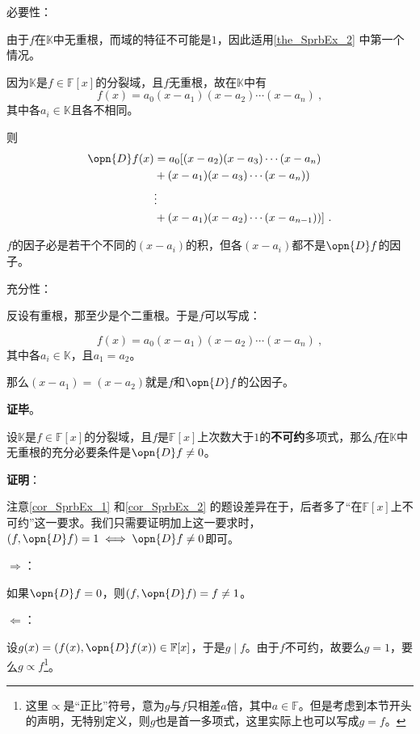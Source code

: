 必要性：

由于$f$在$\mathbb{K}$中无重根，而域的特征不可能是$1$，因此适用\autoref{the_SprbEx_2} 中第一个情况。

因为$\mathbb{K}$是$f\in\mathbb{F}[x]$的分裂域，且$f$无重根，故在$\mathbb{K}$中有
\begin{equation}
f(x) = a_0(x-a_1)(x-a_2)\cdots(x-a_n)~,
\end{equation}
其中各$a_i\in\mathbb{K}$且各不相同。

则
\begin{equation}
\begin{aligned}
\opn{D}f(x) &= a_0[(x-a_2)(x-a_3)\cdots(x-a_n)\\
&+(x-a_1)(x-a_3)\cdots(x-a_n))\\
&\vdots\\
&+(x-a_1)(x-a_2)\cdots(x-a_{n-1}))
]~.
\end{aligned}
\end{equation}

$f$的因子必是若干个不同的$(x-a_i)$的积，但各$(x-a_i)$都不是$\opn{D}f$的因子。

充分性：

反设有重根，那至少是个二重根。于是$f$可以写成：

\begin{equation}
f(x) = a_0(x-a_1)(x-a_2)\cdots(x-a_n)~,
\end{equation}
其中各$a_i\in\mathbb{K}$，且$a_1=a_2$。

那么$(x-a_1)=(x-a_2)$就是$f$和$\opn{D}f$的公因子。

\textbf{证毕}。



\begin{corollary}{}\label{cor_SprbEx_2}
设$\mathbb{K}$是$f\in\mathbb{F}[x]$的分裂域，且$f$是$\mathbb{F}[x]$上次数大于$1$的\textbf{不可约}多项式，那么$f$在$\mathbb{K}$中无重根的充分必要条件是$\opn{D}f \neq 0$。
\end{corollary}

\textbf{证明}：

注意\autoref{cor_SprbEx_1} 和\autoref{cor_SprbEx_2} 的题设差异在于，后者多了“在$\mathbb{F}[x]$上不可约”这一要求。我们只需要证明加上这一要求时，$(f, \opn{D}f)=1 \iff \opn{D}f\neq 0$即可。

$\Rightarrow$：

如果$\opn{D}f=0$，则$(f, \opn{D}f)=f\neq 1$。

$\Leftarrow$：

设$g(x)=(f(x), \opn{D}f(x))\in\mathbb{F}[x]$，于是$g\mid f$。由于$f$不可约，故要么$g=1$，要么$g\propto f$\footnote{这里$\propto$是“正比”符号，意为$g$与$f$只相差$a$倍，其中$a\in\mathbb{F}$。但是考虑到本节开头的声明，无特别定义，则$g$也是首一多项式，这里实际上也可以写成$g=f$。}。

